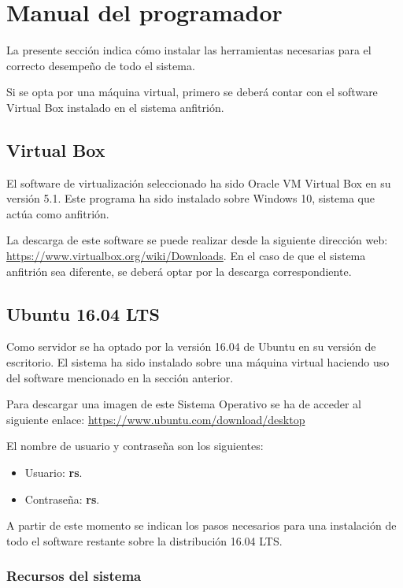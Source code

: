 \section{Manual del programador}

La presente sección indica cómo instalar las herramientas necesarias para el correcto desempeño de todo el sistema.

Si se opta por una máquina virtual, primero se deberá contar con el software Virtual Box instalado en el sistema anfitrión.

\subsection{Virtual Box}
El software de virtualización seleccionado ha sido Oracle VM Virtual Box en su versión 5.1. Este programa ha sido instalado sobre Windows 10, sistema que actúa como anfitrión.

La descarga de este software se puede realizar desde la siguiente dirección web: \url{https://www.virtualbox.org/wiki/Downloads}. En el caso de que el sistema anfitrión sea diferente, se deberá optar por la descarga correspondiente.

\subsection{Ubuntu 16.04 LTS}
Como servidor se ha optado por la versión 16.04 de Ubuntu en su versión de escritorio. El sistema ha sido instalado sobre una máquina virtual haciendo uso del software mencionado en la sección anterior.

Para descargar una imagen de este Sistema Operativo se ha de acceder al siguiente enlace: \url{https://www.ubuntu.com/download/desktop}

El nombre de usuario y contraseña son los siguientes:

\begin{itemize}
	\item Usuario: \textbf{rs}.
	\item Contraseña: \textbf{rs}.
\end{itemize}

A partir de este momento se indican los pasos necesarios para una instalación de todo el software restante sobre la distribución 16.04 LTS.

\subsubsection{Recursos del sistema}

